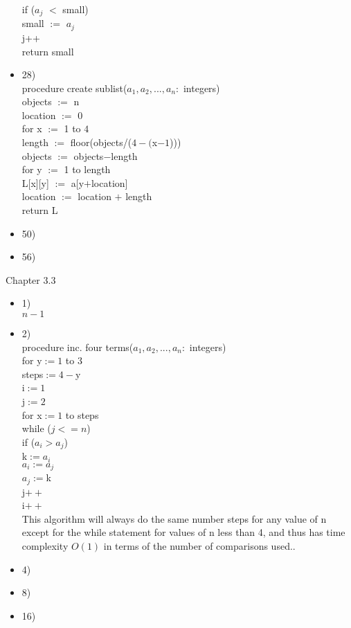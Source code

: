 \documentclass{article}
\newcommand{\tab}{\hspace*{1em}}
\begin{document}
\begin{itemize}
		\tab if ($a_{j}$ $<$ small)\\
		\tab \tab small $:=$ $a_{j}$\\
		\tab j++\\
		return small\\
	\item
		28)\\
		procedure create sublist($a_{1},a_{2},...,a_{n}:$ integers)\\
		objects $:=$ n\\
		location $:=$ 0\\
		for x $:=$ 1 to $4$\\
		\tab length $:=$ floor(objects/($4-($x$-1$)))\\
		\tab objects $:=$ objects$-$length\\
		\tab for y $:=$ 1 to length\\
		\tab \tab L[x][y] $:=$ a[y$+$location]\\
		\tab location $:=$ location $+$ length\\
		return L
	\item
		50)\\
	\item
		56)\\
\end{itemize}
Chapter 3.3
\begin{itemize}
  \item
  1)\\
  $n-1$
  \item
  2)\\
  procedure inc. four terms($a_{1},a_{2},...,a_{n}:$ integers)\\
    for y$:=1$ to 3\\
  \tab steps$:=4-$y\\
  \tab i$:=1$\\
  \tab j$:=2$\\
  \tab for x$:=1$ to steps\\
  \tab \tab while ($j<=n$)\\
  \tab \tab \tab if ($a_{i}>a_{j}$)\\
  \tab \tab \tab \tab k$:=a_{i}$\\
  \tab \tab \tab \tab $a_{i}:=a_{j}$\\
  \tab \tab \tab \tab $a_{j}:=$k\\
  \tab \tab \tab \tab j$++$\\
  \tab \tab \tab \tab i$++$\\

  This algorithm will always do the same number steps for any value of n except for the while statement for values of n less than 4, and thus has time complexity $O(1)$ in terms of the number of comparisons used..
  \item
  4)\\

  \item
  8)\\
  \item
  16)\\
\end{itemize}
\end{document}
